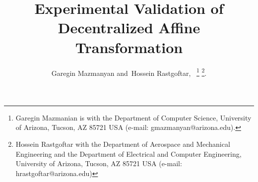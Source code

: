 \documentclass[journal]{IEEEtran}
\theoremstyle{definition}
\theoremstyle{plain}
\begin{document}
%
\title{Experimental Validation of Decentralized Affine Transformation}
%
%
%

\author{Garegin Mazmanyan
        and~Hossein Rastgoftar,~%
\thanks{Garegin Mazmanian is with the Department of Computer Science, University of Arizona, Tucson, AZ 85721 USA (e-mail: gmazmanyan@arizona.edu).}%
\thanks{Hossein Rastgoftar  with the Department of Aerospace and Mechanical Engineering and the Department of Electrical and Computer Engineering, University of Arizona, Tucson, AZ 85721 USA (e-mail: hrastgoftar@arizona.edu)}.%
}

% 
%
\end{document}
